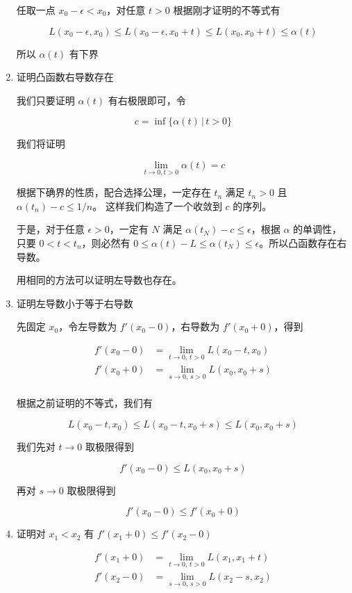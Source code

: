 \documentclass[12pt,a4paper]{ctexart}
\begin{document}
\begin{enumerate}
任取一点 $x_0 - \epsilon < x_0$，对任意 $t > 0$ 根据刚才证明的不等式有

\[
L(x_0 - \epsilon, x_0) \le L(x_0 - \epsilon, x_0 + t) \le L(x_0, x_0 + t) \le \alpha(t)
\]

所以 $\alpha(t)$ 有下界

\item 证明凸函数右导数存在

我们只要证明 $\alpha(t)$ 有右极限即可，令

\[
c = \inf \{ \alpha(t) \,\vert\, t > 0 \}
\]

我们将证明

\[
\lim_{t \to 0, t > 0} \alpha(t) = c
\]

根据下确界的性质，配合选择公理，一定存在 $t_n $ 满足 $t_n > 0$ 且 $\alpha(t_n) - c \le 1/n$。
这样我们构造了一个收敛到 $c$ 的序列。

于是，对于任意 $\epsilon > 0$，一定有 $N$ 满足 $\alpha(t_N) - c \le \epsilon$，根据 $\alpha$ 的单调性， 只要 $0 < t < t_n$，则必然有 
$0 \le \alpha(t) - L \le \alpha(t_N) \le \epsilon$。所以凸函数存在右导数。

用相同的方法可以证明左导数也存在。

\item 证明左导数小于等于右导数

先固定 $x_0$，令左导数为 $f'(x_0 - 0)$，右导数为 $f'(x_0 + 0)$，得到

\begin{align*}
f'(x_0 - 0) &= \lim_{t \to 0,\, t > 0}L(x_0 - t, x_0) \\
f'(x_0 + 0) &= \lim_{s \to 0,\, s > 0}L(x_0, x_0 + s) \\
\end{align*}

根据之前证明的不等式，我们有

\[
L(x_0 - t, x_0) \le L(x_0-t, x_0 + s) \le L(x_0, x_0+s)
\]

我们先对 $t \to 0$ 取极限得到

\[
f'(x_0-0) \le L(x_0, x_0+s)
\]

再对 $s \to 0$ 取极限得到


\[
f'(x_0-0) \le f'(x_0 + 0)
\]

\item 证明对 $x_1 < x_2$ 有 $f'(x_1 +0) \le f'(x_2-0)$

\begin{align*}
f'(x_1 + 0) &= \lim_{t \to 0,\, t > 0}L(x_1, x_1+t) \\
f'(x_2 - 0) &= \lim_{s \to 0,\, s > 0}L(x_2-s, x_2) \\
\end{align*}



\end{enumerate}
\end{document}
